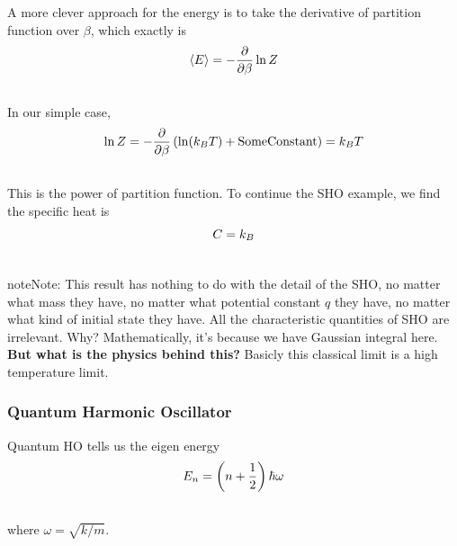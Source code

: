\documentclass[letterpaper,10pt,english]{sphinxmanual}
\begin{document}
A more clever approach for the energy is to take the derivative of partition function over $\beta$, which exactly is
\begin{gather}
\begin{split}\langle E \rangle = -\frac{\partial }{\partial \beta } \ln Z\end{split}\notag\\\begin{split}\end{split}\notag
\end{gather}
In our simple case,
\begin{gather}
\begin{split}\ln Z = -\frac{\partial}{\partial \beta} \left(\ln (k_B T) + \mathrm{Some Constant} \right)= k_B T\end{split}\notag\\\begin{split}\end{split}\notag
\end{gather}
This is the power of partition function. To continue the SHO example, we find the specific heat is
\begin{gather}
\begin{split}C = k_B\end{split}\notag\\\begin{split}\end{split}\notag
\end{gather}
\begin{notice}{note}{Note:}
This result has nothing to do with the detail of the SHO, no matter what mass they have, no matter what potential constant $q$ they have, no matter what kind of initial state they have. All the characteristic quantities of SHO are irrelevant. Why? Mathematically, it's because we have Gaussian integral here. \textbf{But what is the physics behind this?} Basicly this classical limit is a high temperature limit.
\end{notice}


\subsubsection{Quantum Harmonic Oscillator}
\label{equilibrium/week2:quantum-harmonic-oscillator}
Quantum HO tells us the eigen energy
\begin{gather}
\begin{split}E_n  = \left(n + \frac{1}{2}\right)\hbar \omega\end{split}\notag\\\begin{split}\end{split}\notag
\end{gather}
where $\omega = \sqrt{ k/m }$.
\end{document}
